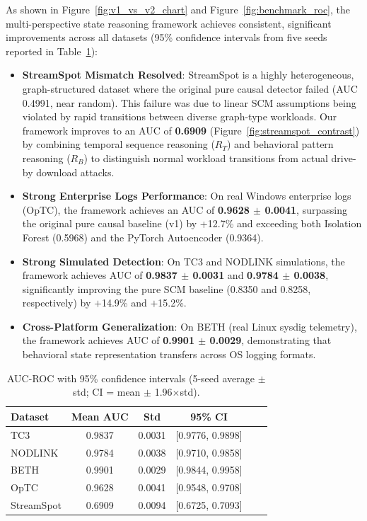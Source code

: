 As shown in Figure~\ref{fig:v1_vs_v2_chart} and Figure~\ref{fig:benchmark_roc}, the multi-perspective state reasoning framework achieves consistent, significant improvements across all datasets (95\% confidence intervals from five seeds reported in Table~\ref{tab:performance_ci}):
\begin{itemize}
\item \textbf{StreamSpot Mismatch Resolved}: StreamSpot is a highly heterogeneous, graph-structured dataset where the original pure causal detector failed (AUC 0.4991, near random). This failure was due to linear SCM assumptions being violated by rapid transitions between diverse graph-type workloads. Our framework improves to an AUC of \textbf{0.6909} (Figure~\ref{fig:streamspot_contrast}) by combining temporal sequence reasoning ($R_T$) and behavioral pattern reasoning ($R_B$) to distinguish normal workload transitions from actual drive-by download attacks.
\item \textbf{Strong Enterprise Logs Performance}: On real Windows enterprise logs (OpTC), the framework achieves an AUC of \textbf{0.9628 $\pm$ 0.0041}, surpassing the original pure causal baseline (v1) by +12.7\% and exceeding both Isolation Forest (0.5968) and the PyTorch Autoencoder (0.9364).
\item \textbf{Strong Simulated Detection}: On TC3 and NODLINK simulations, the framework achieves AUC of \textbf{0.9837 $\pm$ 0.0031} and \textbf{0.9784 $\pm$ 0.0038}, significantly improving the pure SCM baseline (0.8350 and 0.8258, respectively) by $+$14.9\% and $+$15.2\%.
\item \textbf{Cross-Platform Generalization}: On BETH (real Linux sysdig telemetry), the framework achieves AUC of \textbf{0.9901 $\pm$ 0.0029}, demonstrating that behavioral state representation transfers across OS logging formats.
\end{itemize}

\begin{table}[htbp]
\centering
\small
\caption{AUC-ROC with 95\% confidence intervals (5-seed average $\pm$ std; CI = mean $\pm$ 1.96$\times$std).}
\begin{tabular}{lccccc}
\toprule
Dataset & Mean AUC & Std & 95\% CI \\
\midrule
TC3        & 0.9837 & 0.0031 & [0.9776, 0.9898] \\
NODLINK    & 0.9784 & 0.0038 & [0.9710, 0.9858] \\
BETH       & 0.9901 & 0.0029 & [0.9844, 0.9958] \\
OpTC       & 0.9628 & 0.0041 & [0.9548, 0.9708] \\
StreamSpot & 0.6909 & 0.0094 & [0.6725, 0.7093] \\
\bottomrule
\end{tabular}
\label{tab:performance_ci}
\end{table}

